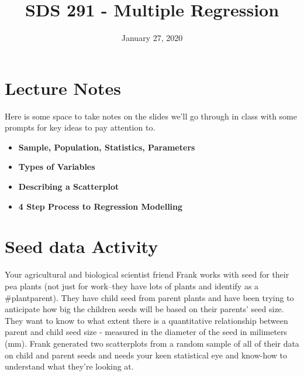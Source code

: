 \documentclass[]{article}
\title{SDS 291 - Multiple Regression}
\author{}
\date{\vspace{-2.5em}January 27, 2020}
\providecommand{\tightlist}{%
  \setlength{\itemsep}{0pt}\setlength{\parskip}{0pt}}
\begin{document}
\maketitle

\hypertarget{lecture-notes}{%
\section{Lecture Notes}\label{lecture-notes}}

Here is some space to take notes on the slides we'll go through in class
with some prompts for key ideas to pay attention to.

\begin{itemize}
\tightlist
\item
  \textbf{Sample, Population, Statistics, Parameters}
\end{itemize}

\vspace{0.5in}

\begin{itemize}
\tightlist
\item
  \textbf{Types of Variables}
\end{itemize}

\vspace{1.5in}

\begin{itemize}
\tightlist
\item
  \textbf{Describing a Scatterplot}
\end{itemize}

\vspace{2in}

\begin{itemize}
\tightlist
\item
  \textbf{4 Step Process to Regression Modelling}
\end{itemize}

\vspace{2in}

\newpage

\hypertarget{seed-data-activity}{%
\section{Seed data Activity}\label{seed-data-activity}}

Your agricultural and biological scientist friend Frank works with seed
for their pea plants (not just for work--they have lots of plants and
identify as a \#plantparent). They have child seed from parent plants
and have been trying to anticipate how big the children seeds will be
based on their parents' seed size. They want to know to what extent
there is a quantitative relationship between parent and child seed size
- measured in the diameter of the seed in milimeters (mm). Frank
generated two scatterplots from a random sample of all of their data on
child and parent seeds and needs your keen statistical eye and know-how
to understand what they're looking at.
\end{document}

